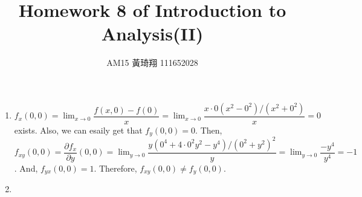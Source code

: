 \documentclass[12pt]{article}
\title{Homework 8 of Introduction to Analysis(II)}
\author{AM15 黃琦翔 111652028}
\begin{document}
\maketitle
\begin{enumerate}
    \item $f_x(0, 0) = \displaystyle\lim_{x\to 0} \dfrac{f(x, 0) - f(0)}{x} = \displaystyle\lim_{x\to 0} \dfrac{x\cdot 0(x^2-0^2)/(x^2+0^2)}{x} = 0$ exists.
    Also, we can esaily get that $f_y(0, 0) = 0$.
    Then, $f_{xy}(0, 0) = \dfrac{\partial f_x}{\partial y}(0, 0) = \displaystyle\lim_{y\to 0} \dfrac{y(0^4+4\cdot 0^2y^2 - y^4)/(0^2 + y^2)^2}{y} = \displaystyle\lim_{y\to 0} \dfrac{-y^4}{y^4} = -1$.
    And, $f_{yx}(0, 0) = 1$.
    Therefore, $f_{xy}(0, 0) \neq f_{y}(0, 0)$.

    \item 
\end{enumerate}
\end{document}
